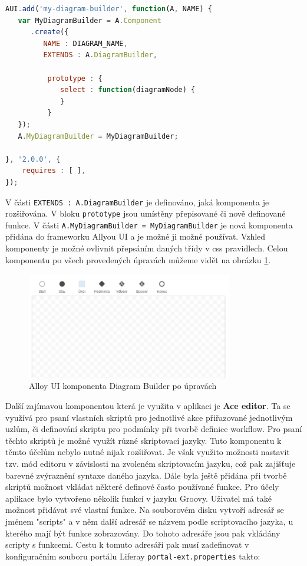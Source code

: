 \documentclass{fithesis}
\begin{document}
\begin{lstlisting}[language=JavaScript, caption = Rozšíření komponenty Diagram Builder , label = code:diagram_builder]
AUI.add('my-diagram-builder', function(A, NAME) {
   var MyDiagramBuilder = A.Component
      .create({
         NAME : DIAGRAM_NAME,
         EXTENDS : A.DiagramBuilder,

          prototype : {
             select : function(diagramNode) {
             }
          }
   });
   A.MyDiagramBuilder = MyDiagramBuilder;

}, '2.0.0', {
	requires : [ ],
});

\end{lstlisting}

V části \verb|EXTENDS : A.DiagramBuilder| je definováno, jaká komponenta je rozšiřována. V bloku \verb|prototype| jsou umístěny přepisované či nově definované funkce. V části \verb|A.MyDiagramBuilder = MyDiagramBuilder| je nová komponenta přidána do frameworku Allyou UI a je možné ji možné používat. Vzhled komponenty je možné ovlivnit přepsáním daných třídy v css pravidlech. Celou komponentu po všech provedených úpravách můžeme vidět na obrázku  \ref{fig:diagram_builder_uprav}.

\begin{figure}[htp]
\centering
\includegraphics[width=340px]{images/diagram_builder_uprav.png}
\caption{Alloy UI komponenta Diagram Builder po úpravách}
\label{fig:diagram_builder_uprav}
\end{figure}

Další zajímavou komponentou která je využita v aplikaci je \textbf{Ace editor}. Ta se využívá pro psaní vlastních skriptů pro jednotlivé akce přiřazované jednotlivým uzlům, či definování skriptu pro podmínky při tvorbě definice workflow. Pro psaní těchto skriptů je možné využít různé skriptovací jazyky. Tuto komponentu k těmto účelům nebylo nutné nijak rozšiřovat. Je však využito možnosti nastavit tzv. mód editoru v závislosti na zvoleném skriptovacím jazyku, což pak zajišťuje barevné zvýraznění syntaxe daného jazyka. Dále byla ještě přidána při tvorbě skriptů možnost vkládat některé definové často používané funkce. Pro účely aplikace bylo vytvořeno několik funkcí v jazyku Groovy. Uživatel má také možnost přidávat své vlastní funkce. Na souborovém disku vytvoří adresář se jménem "scripts" a v něm další adresář se názvem podle scriptovacího jazyka, u kterého mají být funkce zobrazovány. Do tohoto adresáře jsou pak vkládány scripty s funkcemi. Cestu k tomuto adresáři pak musí zadefinovat v konfiguračním souboru portálu Liferay \verb|portal-ext.properties| takto:
\end{document}
